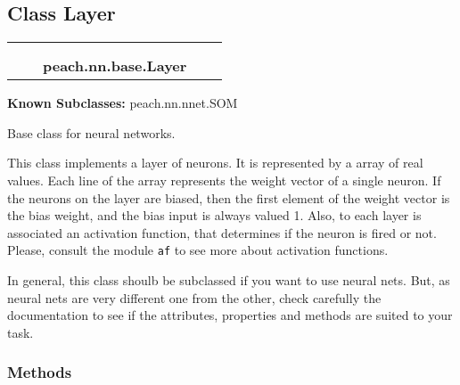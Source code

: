 
\subsection{Class Layer}

    \label{peach:nn:base:Layer}
\begin{tabular}{cccccc}
\multicolumn{2}{r}{\settowidth{\BCL}{object}\multirow{2}{\BCL}{object}}
&&
  \\\cline{3-3}
  &&\multicolumn{1}{c|}{}
&&
  \\
&&\multicolumn{2}{l}{\textbf{peach.nn.base.Layer}}
\end{tabular}

\textbf{Known Subclasses:} peach.nn.nnet.SOM


Base class for neural networks.

This class implements a layer of neurons. It is represented by a array of
real values. Each line of the array represents the weight vector of a
single neuron. If the neurons on the layer are biased, then the first
element of the weight vector is the bias weight, and the bias input is
always valued 1. Also, to each layer is associated an activation function,
that determines if the neuron is fired or not. Please, consult the module
\texttt{af} to see more about activation functions.

In general, this class shoulb be subclassed if you want to use neural nets.
But, as neural nets are very different one from the other, check carefully
the documentation to see if the attributes, properties and methods are
suited to your task.


  \subsubsection{Methods}

    \vspace{0.5ex}

